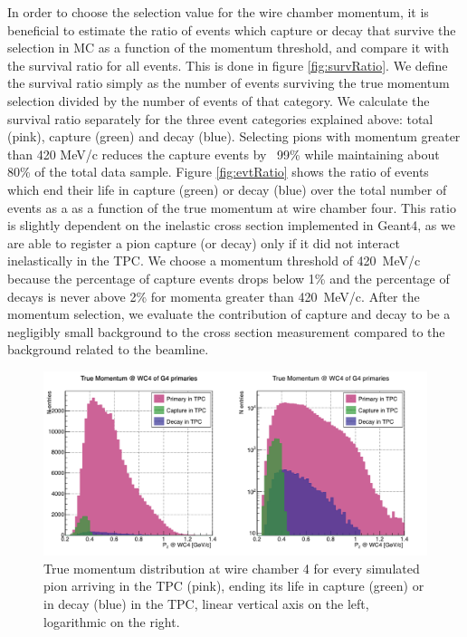 In order to choose the selection value for the wire chamber momentum, it is beneficial to estimate the ratio of events which capture or decay that survive the selection in MC as a function of the momentum threshold, and compare it with the survival ratio for all events. This is done in figure \ref{fig:survRatio}. We define the survival ratio simply  as the number of events surviving the true momentum selection divided by the number of events of that category. We calculate the survival ratio separately for the three event categories explained above: total (pink), capture (green) and decay (blue).
Selecting pions with momentum greater than 420 MeV/c reduces the capture events by ~99\% while maintaining about 80\% of the total data sample. 
Figure \ref{fig:evtRatio} shows the ratio of events which end their life in capture (green) or decay (blue) over the total number of events as a as a function of the true momentum at wire chamber four. This ratio is slightly dependent on the inelastic cross section implemented in Geant4, as we are able to register a pion capture (or decay) only if it did not interact inelastically in the TPC. We choose a momentum threshold of 420~MeV/c because the percentage of capture events drops below 1\% and the percentage of decays is never above 2\% for momenta greater than 420~MeV/c. After the momentum selection, we evaluate the contribution of capture and decay to be a negligibly small background to the cross section measurement compared to the background related to the beamline.

\begin{figure}[p]
\centering
\includegraphics[width=15cm]{Chapter-7/Images/CDAsMomentumFunct.png}
\caption{True momentum distribution at wire chamber 4 for every simulated pion arriving in the TPC (pink), ending its life in capture (green) or in decay (blue) in the TPC, linear vertical axis on the left, logarithmic on the right. }
\label{fig:CaptureMom}
\end{figure}

